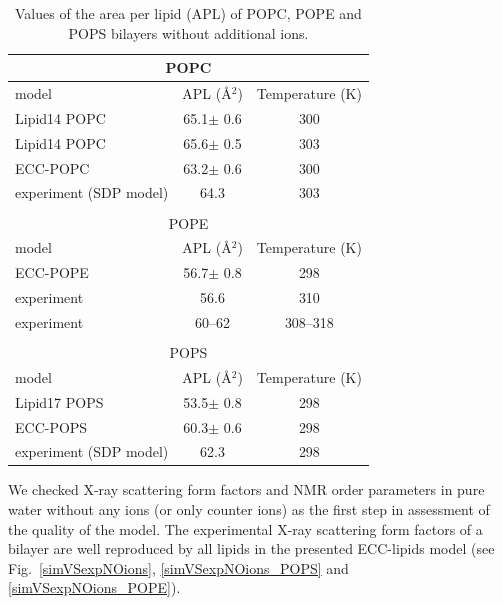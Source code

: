 \begin{table}[tb!] 
  \caption{Values of the area per lipid (APL) of POPC, POPE and POPS bilayers without additional ions. \label{tab:apls} 
  } 
  \begin{tabular}{l|c c} 
    \multicolumn{3}{c}{POPC} \\
    \hline 
    model          & APL (Å$^2$)   & Temperature (K) \\ 
    \hline 
    Lipid14 POPC                    & 65.1$\pm$ 0.6  &  300 \\ 
    Lipid14 POPC \citep{dickson14}  & 65.6$\pm$ 0.5  &  303 \\ 
    \hline 
    ECC-POPC                & 63.2$\pm$ 0.6  &  300       \\ 
    \hline 
    experiment (SDP model) \citep{kucerka11} & 64.3  &  303    \\ 
    \hline 
    \\
    \multicolumn{3}{c}{POPE} \\
    \hline 
    model          & APL (Å$^2$)   & Temperature (K) \\ 
    \hline 
    ECC-POPE                 & 56.7$\pm$ 0.8  &  298 \\ 
    \hline 
    experiment   \citep{parsegian89} & 56.6  &  310    \\ 
    experiment   \citep{rappolt03}   & 60--62 &  308--318  \\ 
    \hline 
    \\
    \multicolumn{3}{c}{POPS} \\
    \hline 
    model          & APL (Å$^2$)   & Temperature (K) \\ 
    \hline 
    Lipid17 POPS              & 53.5$\pm$ 0.8  &  298 \\ 
    \hline 
    ECC-POPS                & 60.3$\pm$ 0.6  &  298       \\ 
    \hline 
    experiment (SDP model) \cite{SDP-CHARMM36_comparison_paper_Samuli-knows} & 62.3  &  298    \\ 
    \hline 
  \end{tabular} 
\end{table} 
 
 
We checked X-ray scattering form factors and NMR order parameters 
in pure water without any ions (or only counter ions)
as the first step in assessment of the quality of the model. 
The experimental X-ray scattering form factors 
of a bilayer are well reproduced by all lipids in the presented ECC-lipids model 
(see Fig.~\ref{simVSexpNOions}, \ref{simVSexpNOions_POPS} and \ref{simVSexpNOions_POPE}). 

